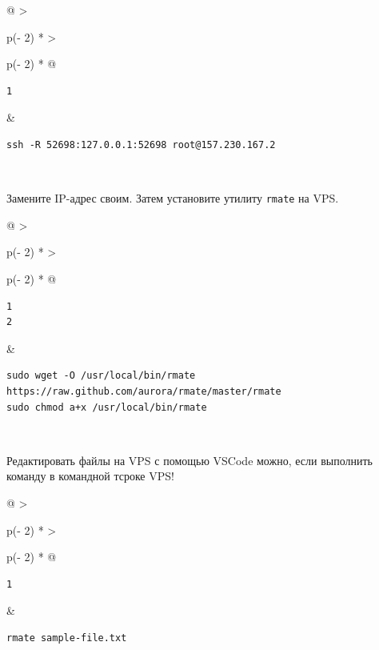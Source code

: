 \documentclass{report}
\begin{document}
\begin{longtable}[]{@{}
  >{\raggedright\arraybackslash}p{(\columnwidth - 2\tabcolsep) * }
  >{\raggedright\arraybackslash}p{(\columnwidth - 2\tabcolsep) * }@{}}
\toprule
\endhead
\begin{minipage}[t]{\linewidth}\raggedright
\begin{verbatim}
1
\end{verbatim}
\end{minipage} & \begin{minipage}[t]{\linewidth}\raggedright
\begin{verbatim}
ssh -R 52698:127.0.0.1:52698 root@157.230.167.2
\end{verbatim}
\end{minipage} \\ \addlinespace
\bottomrule
\end{longtable}

Замените IP-адрес своим. Затем установите утилиту \texttt{rmate} на VPS.

\begin{longtable}[]{@{}
  >{\raggedright\arraybackslash}p{(\columnwidth - 2\tabcolsep) * }
  >{\raggedright\arraybackslash}p{(\columnwidth - 2\tabcolsep) * }@{}}
\toprule
\endhead
\begin{minipage}[t]{\linewidth}\raggedright
\begin{verbatim}
1
2
\end{verbatim}
\end{minipage} & \begin{minipage}[t]{\linewidth}\raggedright
\begin{verbatim}
sudo wget -O /usr/local/bin/rmate https://raw.github.com/aurora/rmate/master/rmate
sudo chmod a+x /usr/local/bin/rmate
\end{verbatim}
\end{minipage} \\ \addlinespace
\bottomrule
\end{longtable}

Редактировать файлы на VPS с помощью VSCode можно, если выполнить
команду в командной тсроке VPS!

\begin{longtable}[]{@{}
  >{\raggedright\arraybackslash}p{(\columnwidth - 2\tabcolsep) * }
  >{\raggedright\arraybackslash}p{(\columnwidth - 2\tabcolsep) * }@{}}
\toprule
\endhead
\begin{minipage}[t]{\linewidth}\raggedright
\begin{verbatim}
1
\end{verbatim}
\end{minipage} & \begin{minipage}[t]{\linewidth}\raggedright
\begin{verbatim}
rmate sample-file.txt
\end{verbatim}
\end{minipage} \\ \addlinespace
\bottomrule
\end{longtable}
\end{document}
